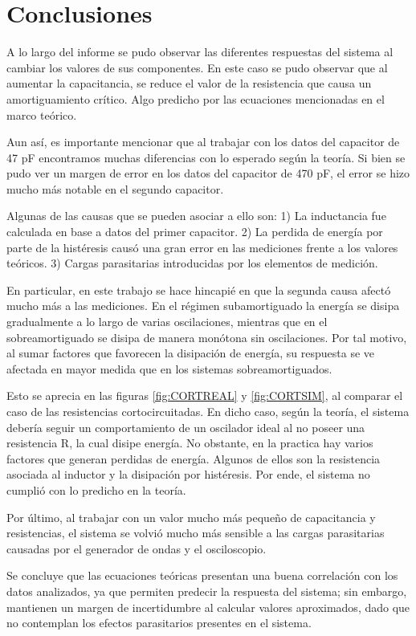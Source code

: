 \documentclass{article}
\begin{document}
\section{Conclusiones}
	A lo largo del informe se pudo observar las diferentes respuestas del sistema al cambiar los valores de sus componentes. En este caso se pudo observar que al aumentar la capacitancia, se reduce el valor de la resistencia que causa un amortiguamiento crítico. Algo predicho por las ecuaciones mencionadas en el marco teórico.\par
	Aun así, es importante mencionar que al trabajar con los datos del capacitor de 47 pF encontramos muchas diferencias con lo esperado según la teoría. Si bien se pudo ver un margen de error en los datos del capacitor de 470 pF, el error se hizo mucho más notable en el segundo capacitor.\par
	Algunas de las causas que se pueden asociar a ello son: 1) La inductancia fue calculada en base a datos del primer capacitor. 2) La perdida de energía por parte de la histéresis causó una gran error en las mediciones frente a los valores teóricos. 3) Cargas parasitarias introducidas por los elementos de medición.\par
	En particular, en este trabajo se hace hincapié en que la segunda causa afectó mucho más a las mediciones. En el régimen subamortiguado la energía se disipa gradualmente a lo largo de varias oscilaciones, mientras que en el sobreamortiguado se disipa de manera monótona sin oscilaciones. Por tal motivo, al sumar factores que favorecen la disipación de energía, su respuesta se ve afectada en mayor medida que en los sistemas sobreamortiguados. \par
	 Esto se aprecia en las figuras \ref{fig:CORTREAL} y \ref{fig:CORTSIM}, al comparar el caso de las resistencias cortocircuitadas. En dicho caso, según la teoría, el sistema debería seguir un comportamiento de un oscilador ideal al no poseer una resistencia R, la cual disipe energía. No obstante, en la practica hay varios factores que generan perdidas de energía. Algunos de ellos son la resistencia asociada al inductor y la disipación por histéresis. Por ende, el sistema no cumplió con lo predicho en la teoría.\par
	 Por último, al trabajar con un valor mucho más pequeño de capacitancia y resistencias, el sistema se volvió mucho más sensible a las cargas parasitarias causadas por el generador de ondas y el osciloscopio.\par
	Se concluye que las ecuaciones teóricas presentan una buena correlación con los datos analizados, ya que permiten predecir la respuesta del sistema; sin embargo, mantienen un margen de incertidumbre al calcular valores aproximados, dado que no contemplan los efectos parasitarios presentes en el sistema.	
	
\end{document}

